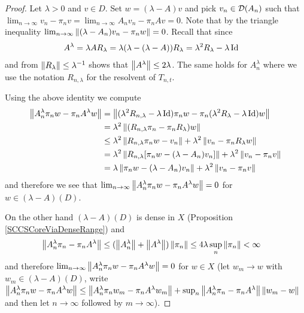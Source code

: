 \begin{proof}
Let $\lambda > 0$ and $v \in D$.  Set $w = (\lambda - A) v$ and pick $v_n \in \mathcal{D}(A_n)$ such that $\lim_{n \to \infty} {v_n - \pi_n v} = \lim_{n \to \infty} {A_nv_n - \pi_n Av} = 0$.  Note that by the triangle inequality $\lim_{n \to \infty} \left \lVert (\lambda - A_n) v_n - \pi_n w \right \rVert = 0$.  Recall that since 
\begin{align*}
A^\lambda &= \lambda A R_\lambda = \lambda (\lambda - (\lambda - A)) R_\lambda = \lambda^2 R_\lambda - \lambda \operatorname*{Id}
\end{align*}
and from $\left \lVert R_\lambda \right \rVert \leq \lambda^{-1}$ shows that $\left \lVert A^\lambda \right \rVert \leq 2 \lambda$.  The same holds for $A^\lambda_n$ where we use the notation $R_{n, \lambda}$ for the resolvent of $T_{n,t}$.

Using the above identity we compute
\begin{align*}
\left \lVert A^\lambda_n \pi_n w  - \pi_n A^\lambda w \right \rVert 
&= \left \lVert (\lambda^2 R_{n,\lambda} - \lambda \operatorname*{Id}) \pi_n w  - \pi_n (\lambda^2 R_{\lambda} - \lambda \operatorname*{Id})  w \right \rVert \\
&=\lambda^2 \left \lVert (R_{n,\lambda} \pi_n - \pi_n R_{\lambda}) w \right \rVert  \\
&\leq \lambda^2 \left \lVert R_{n,\lambda} \pi_n w - v_n \right \rVert  + \lambda^2 \left \lVert v_n - \pi_n R_{\lambda} w \right \rVert  \\
&= \lambda^2 \left \lVert R_{n,\lambda} [\pi_n w - (\lambda - A_n) v_n] \right \rVert  + \lambda^2 \left \lVert v_n - \pi_n v \right \rVert  \\
&= \lambda \left \lVert \pi_n w - (\lambda - A_n) v_n \right \rVert  + \lambda^2 \left \lVert v_n - \pi_n v \right \rVert  \\
\end{align*}
and therefore we see that $\lim_{n \to \infty} \left \lVert A^\lambda_n \pi_n w  - \pi_n A^\lambda w \right \rVert = 0$ for $w \in (\lambda -A)(D)$.

On the other hand $(\lambda - A)(D)$ is dense in $X$ (Proposition \ref{SCCSCoreViaDenseRange}) and 
\begin{align*}
\left \lVert A^\lambda_n \pi_n - \pi_n A^\lambda \right \rVert &\leq (\left \lVert A^\lambda_n \right \rVert + \left \lVert A^\lambda \right \rVert) \left \lVert \pi_n \right \rVert \leq 4 \lambda \sup_{n} \left \lVert \pi_n \right \rVert < \infty
\end{align*}
and therefore $\lim_{n \to \infty} \left \lVert A^\lambda_n \pi_n w  - \pi_n A^\lambda w \right \rVert = 0$ for $w \in X$ (let $w_m \to w$ with $w_m \in  (\lambda -A)(D)$, write
$\left \lVert A^\lambda_n \pi_n w  - \pi_n A^\lambda w \right \rVert \leq \left \lVert A^\lambda_n \pi_n w_m  - \pi_n A^\lambda w_m \right \rVert + \sup_n \left \lVert A^\lambda_n \pi_n - \pi_n A^\lambda \right \rVert \left \lVert w_m -w \right \rVert$
and then let $n \to \infty$ followed by $m \to \infty$).
\end{proof}

